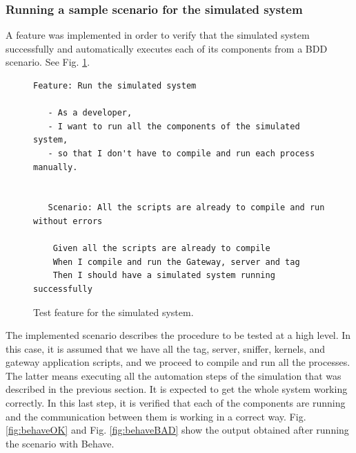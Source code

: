 \documentclass[journal]{IEEEtran}	%
\begin{document}
\subsubsection{Running a sample scenario for the simulated system}


A feature was implemented in order to verify that the simulated system successfully and automatically executes each of its components from a BDD scenario. See Fig. \ref{fig:simsys}.

\begin{figure}[t!]
\centering
\begin{lstlisting}[]
 Feature: Run the simulated system

   - As a developer,
   - I want to run all the components of the simulated system,
   - so that I don't have to compile and run each process manually.


   Scenario: All the scripts are already to compile and run without errors

    Given all the scripts are already to compile 
    When I compile and run the Gateway, server and tag
    Then I should have a simulated system running successfully
\end{lstlisting}
\caption{Test feature for the simulated system.}
\label{fig:simsys}
\end{figure}

The implemented scenario describes the procedure to be tested at a high level. In this case, it is assumed that we have all the tag, server, sniffer, kernels, and gateway application scripts, and we proceed to compile and run all the processes. The latter means executing all the automation steps of the simulation that was described in the previous section. It is expected to get the whole system working correctly. In this last step, it is verified that each of the components are running and the communication between them is working in a correct way. Fig. \ref{fig:behaveOK} and Fig. \ref{fig:behaveBAD} show the output obtained after running the scenario with Behave.
\end{document}
